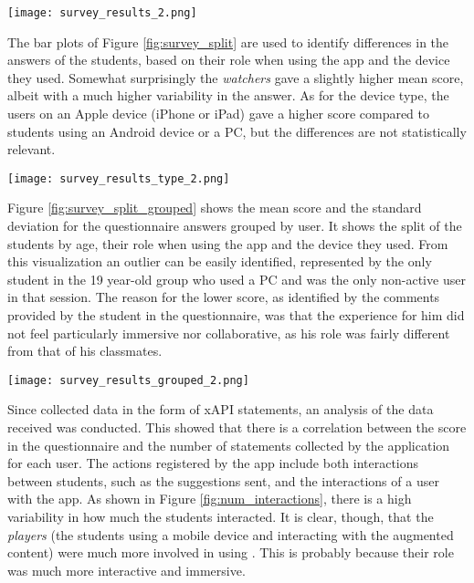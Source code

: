 \begin{figure*}[htbp]
    \centering
    \texttt{[image: survey\_results\_2.png]}
    \caption{\fontsize{10pt}{11pt}}
    \label{fig:survey_all}
\end{figure*}

The bar plots of Figure \ref{fig:survey_split} are used to identify differences in the answers of the students, based on their role when using the app and the device they used.
Somewhat surprisingly the \textit{watchers} gave a slightly higher mean score, albeit with a much higher variability in the answer.
As for the device type, the users on an Apple device (iPhone or iPad) gave a higher score compared to students using an Android device or a PC, but the differences are not statistically relevant.

\begin{figure*}[htbp]
    \centering
    \texttt{[image: survey\_results\_type\_2.png]}
    \caption{\fontsize{10pt}{11pt}}
    \label{fig:survey_split}
\end{figure*}

Figure \ref{fig:survey_split_grouped} shows the mean score and the standard deviation for the questionnaire answers grouped by user.
It shows the split of the students by age, their role when using the app and the device they used.
From this visualization an outlier can be easily identified, represented by the only student in the 19 year-old group who used a PC and was the only non-active user in that session.
The reason for the lower score, as identified by the comments provided by the student in the questionnaire, was that the experience for him did not feel particularly immersive nor collaborative, as his role was fairly different from that of his classmates. 

\begin{figure*}[htbp]
    \centering
    \texttt{[image: survey\_results\_grouped\_2.png]}
    \caption{\fontsize{10pt}{11pt}}
    \label{fig:survey_split_grouped}
\end{figure*}

Since \appname{} collected data in the form of xAPI statements, an analysis of the data received was conducted. This showed that there is a correlation between the score in the questionnaire and the number of statements collected by the application for each user.
The actions registered by the app include both interactions between students, such as the suggestions sent, and the interactions of a user with the app.
As shown in Figure \ref{fig:num_interactions}, there is a high variability in how much the students interacted. It is clear, though, that the \textit{players} (the students using a mobile device and interacting with the augmented content) were much more involved in using \appname{}. This is probably because their role was much more interactive and immersive.

